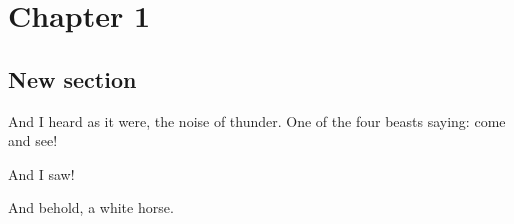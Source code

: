 \documentclass[a4paper,12pt,twoside]{book}
\begin{document}
\chapter{Chapter 1}
\section{New section}
 
And I heard as it were, the noise of thunder.  One of the four beasts saying: come and see!

And I saw! 

And behold, a white horse.
 
\end{document}

